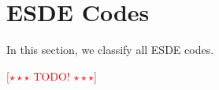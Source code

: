\documentclass[12pt,twoside,singlespace]{article}
\numberwithin{equation}{section}
\theoremstyle{definition}
\newcommand{\com}[1]{\textcolor{red}{$[\star \star \star$ #1 $\star \star \star]$}}
\begin{document}
\section{ESDE Codes}

In this section, we classify all ESDE codes.

\com{TODO!}


\begin{comment}
\section{Other stuff}
\begin{center}
\begin{tabular}{ccc}
\begin{tikzpicture}[scale=0.15]
\SetUpEdge[labelstyle={draw}]
\Vertex[x=10,y=10]{11}
\Vertex[x=0,y=10]{10}
\Vertex[x=10,y=0]{01}
\Vertex[x=0,y=0]{00}
\Edge[color=green](00)(10)
\Edge[color=red](00)(01)
\Edge[color=red](10)(11)
\Edge[color=green](01)(11)
\end{tikzpicture}
&
\begin{tikzpicture}[scale=0.08]
\SetUpEdge[labelstyle={draw}]
\Vertex[x=0,y=0]{111}
\Vertex[x=20,y=0]{011}
\Vertex[x=0,y=20]{101}
\Vertex[x=20,y=20]{001}
\Vertex[x=-10,y=10]{110}
\Vertex[x=10,y=10]{010}
\Vertex[x=-10,y=30]{100}
\Vertex[x=10,y=30]{000}
\Edge[color=red](100)(101)
\Edge[color=red](000)(001)
\Edge[color=red](010)(011)
\Edge[color=red](110)(111)
\Edge[color=green](000)(100)
\Edge[color=green](001)(101)
\Edge[color=green](010)(110)
\Edge[color=green](011)(111)
\Edge[color=blue](000)(010)
\Edge[color=blue](001)(011)
\Edge[color=blue](100)(110)
\Edge[color=blue](101)(111)
\end{tikzpicture}
&
\begin{tikzpicture}[scale=0.14]
\SetUpEdge[labelstyle={draw}]
\Vertex[x=0,y=0]{111}
\Vertex[x=0,y=10]{101}
\Vertex[x=10,y=0]{010}
\Vertex[x=10,y=10]{000}
\Vertex[x=20,y=10]{110}
\Vertex[x=30,y=10]{011}
\Vertex[x=20,y=0]{100}
\Vertex[x=30,y=0]{001}
\Edge[color=red](100)(101)
\Edge[color=red](000)(001)
\Edge[color=red](010)(011)
\Edge[color=red](110)(111)
\Edge[color=green](000)(100)
\Edge[color=green](001)(101)
\Edge[color=green](010)(110)
\Edge[color=green](011)(111)
\Edge[color=blue](000)(010)
\Edge[color=blue](001)(011)
\Edge[color=blue](100)(110)
\Edge[color=blue](101)(111)
\Edge[color=black](100)(011)
\Edge[color=black](000)(111)
\Edge[color=black](010)(101)
\Edge[color=black](110)(001)
\end{tikzpicture}
\end{tabular}
\end{center}


\end{comment}
\end{document}
